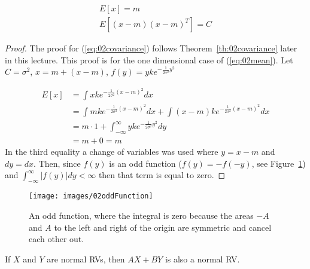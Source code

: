 \begin{theorem}%
\label{th:02mean}
\begin{align}
\label{eq:02mean}
E[x] = m \\
\label{eq:02covariance}
E[(x-m){(x-m)}^T] = C
\end{align}
\end{theorem}
\begin{proof}
The proof for (\ref{eq:02covariance}) follows Theorem~\ref{th:02covariance} later in this lecture.
This proof is for the one dimensional case of (\ref{eq:02mean}).
Let $C=\sigma^2$, $x=m+(x-m)$, $f(y)=yke^{-\frac{1}{2\sigma^2}y^2}$

\begin{align*}
E[x] &= \int xke^{-\frac{1}{2\sigma^2}{(x-m)}^2}dx \\
&= \int mke^{-\frac{1}{2\sigma^2}{(x-m)}^2}dx + \int(x-m)ke^{-\frac{1}{2\sigma^2}{(x-m)}^2}dx \\
&= m \cdot 1 + \int_{-\infty}^\infty yke^{-\frac{1}{2\sigma^2}y^2}dy \\
&= m + 0 = m
\end{align*}
In the third equality a change of variables was used where $y=x-m$ and $dy=dx$.
Then, since $f(y)$ is an odd function ($f(y)=-f(-y)$, see Figure~\ref{fig:02oddFunction}) and $\int_{-\infty}^\infty|f(y)|dy < \infty$ then that term is equal to zero.
\end{proof}

\begin{figure}[ht!]
\centering
\texttt{[image: images/02oddFunction]}
\caption{An odd function, where the integral is zero because the areas $-A$ and $A$ to the left and right of the origin are symmetric and cancel each other out.}%
\label{fig:02oddFunction}
\end{figure}

\begin{theorem}
If $X$ and $Y$ are normal RVs, then $AX+BY$ is also a normal RV\@.
\end{theorem}


